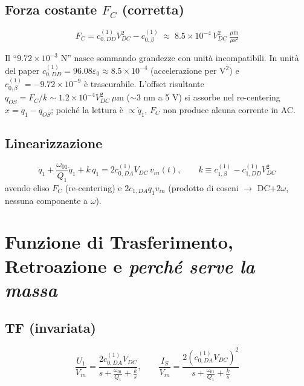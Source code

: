 \documentclass[11pt,a4paper]{article}
\begin{document}
\subsection{Forza costante $F_C$ (corretta)}
\begin{equation}
    F_C = c_{0,DD}^{(1)}V_{DC}^2 - c_{0,\beta}^{(1)}
    \;\approx\; 8.5\times10^{-4}\,V_{DC}^2\ \tfrac{\mu\mathrm{m}}{\mu\mathrm{s}^2}
\end{equation}
\begin{corrbox}
Il ``$9.72\times10^{-3}$ N'' nasce sommando grandezze con unit\`a incompatibili. In unit\`a del paper $c_{0,DD}^{(1)}=96.08\varepsilon_0\approx8.5\times10^{-4}$ (accelerazione per V$^2$) e $c_{0,\beta}^{(1)}=-9.72\times10^{-9}$ \`e trascurabile. L'offset risultante $q_{OS}=F_C/k\sim1.2\times10^{-4}V_{DC}^2\ \mu$m ($\sim3$ nm a 5 V) si assorbe nel re-centering $x=q_1-q_{OS}$; poich\'e la lettura \`e $\propto\dot q_1$, $F_C$ non produce alcuna corrente in AC.
\end{corrbox}

\subsection{Linearizzazione}
\begin{equation}
    \ddot{q}_1 + \frac{\omega_{01}}{Q_1}\dot{q}_1 + k\,q_1 = 2c_{0,DA}^{(1)}V_{DC}\,v_{in}(t),
    \qquad k \equiv c_{1,\beta}^{(1)} - c_{1,DD}^{(1)}V_{DC}^2
\end{equation}
avendo eliso $F_C$ (re-centering) e $2c_{1,DA}q_1v_{in}$ (prodotto di coseni $\to$ DC$+2\omega$, nessuna componente a $\omega$).

\section{Funzione di Trasferimento, Retroazione e \emph{perch\'e serve la massa}}
\subsection{TF (invariata)}
\begin{equation}
    \frac{U_1}{V_{in}}=\frac{2c_{0,DA}^{(1)}V_{DC}}{s+\frac{\omega_{01}}{Q_1}+\frac{k}{s}},
    \qquad
    \frac{I_S}{V_{in}}=\frac{2\left(c_{0,DA}^{(1)}V_{DC}\right)^2}{s+\frac{\omega_{01}}{Q_1}+\frac{k}{s}}
\end{equation}
\end{document}
